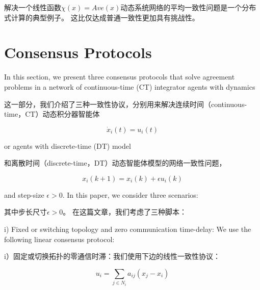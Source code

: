 \documentclass{article}
\begin{document}
解决一个线性函数$\chi(x)=Ave(x)$动态系统网络的平均一致性问题是一个分布式计算的典型例子。
这比仅达成普通一致性更加具有挑战性。

\section{Consensus Protocols}
{\color[gray]{0.5}
\noindent In this section, we present three consensus protocols that solve agreement problems in a network of continuous-time (CT) {\color{green}integrator agents} with dynamics
}

\noindent 这一部分，我们介绍了三种一致性协议，分别用来解决连续时间（continuous-time，CT）动态积分器智能体

\begin{equation}
    \dot{x}_i(t) = u_i(t)
    \tag{4}
    \label{4}
\end{equation}


{\color[gray]{0.5}
\noindent or agents with discrete-time (DT) model
}

\noindent 和离散时间（discrete-time，DT）动态智能体模型的网络一致性问题，

\begin{equation}
    x_i(k+1) = x_i(k)+\epsilon u_i(k)
    \tag{5}
    \label{5}
\end{equation}


{\color[gray]{0.5}
\noindent and step-size $\epsilon>0$. 
In this paper, we consider three scenarios:
}

\noindent 其中步长尺寸$\epsilon>0$。
在这篇文章，我们考虑了三种脚本：

{\color[gray]{0.5}
i) Fixed or switching topology and zero communication time-delay: We use the following linear consensus protocol:
}

i）固定或切换拓扑的零通信时滞：我们使用下边的线性一致性协议：

\begin{equation}
    u_i = \sum_{j\in N_i}a_{ij}(x_j-x_i)
    \tag{A1}
    \label{A1}
\end{equation}
\end{document}
